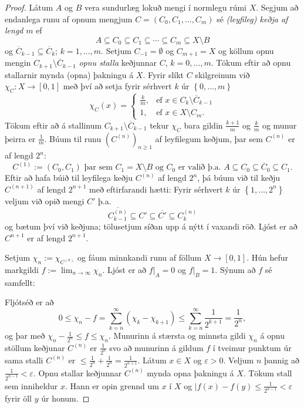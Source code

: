 \documentclass[a4paper,icelandic]{book}
\theoremstyle{definition}
\theoremstyle{plain}
\theoremstyle{remark}
\begin{document}
\begin{proof}
  Látum $A$ og $B$ vera sundurlæg lokuð mengi í normlegu rúmi $X$.
  Segjum að endanlega runu af opnum mengjum $C=(C_0,C_1,\dots,C_m)$ sé
  \emph{(leyfileg) keðja af lengd} $m$ ef\[
  A\subseteq C_0 \subseteq C_1 \subseteq\cdots\subseteq C_m\subseteq
  X\setminus B
  \]
  og $\overline C_{k-1}\subseteq \overline C_k$; $k=1,\dots,m$. Setjum
  $C_{-1}=\emptyset$ og $C_{m+1} = X$ og köllum opnu mengin
  $C_{k+1}\setminus \overline C_{k-1}$ \emph{opnu stalla} keðjunnar $C$,
  $k=0,\dots,m$. Tökum eftir að opnu stallarnir mynda (opna) þakningu á
  $X$. Fyrir slíkt $C$ skilgreinum við $\chi_C:X\to \left[ 0,1 \right]$
  með því að setja fyrir sérhvert $k$ úr $\left\{ 0,\dots,m \right\}$\[
  \chi_C(x) = \begin{cases}
    \frac km, &\text{ef $x\in C_k\setminus \overline C_{k-1}$}\\
    1,        &\text{ef $x\in X\setminus C_m$}.
  \end{cases}
  \]
  Tökum eftir að á stallinum $C_{k+1}\setminus \overline C_{k-1}$ tekur
  $\chi_C$ bara gildin $\frac{k+1}{m}$ og $\frac{k}{m}$ og munur þeirra
  er $\frac 1m$. Búum til runu $(C^{(n)})_{n\geq 1}$ af leyfilegum
  keðjum, þar sem $C^{(n)}$ er af lengd $2^n$:\[
  C^{(1)} := (C_0,C_1)
  \text{ þar sem }
  C_1 = X\setminus B
  \text{ og $C_0$ er valið þ.a. }
  A\subseteq C_0\subseteq\overline C_0 \subseteq C_1.
  \]
  Eftir að hafa búið til leyfilega keðju $C^{(n)}$ af lengd $2^n$, þá
  búum við til keðju $C^{(n+1)}$ af lengd $2^{n+1}$ með eftirfarandi
  hætti: Fyrir sérhvert $k$ úr $\left\{ 1,\dots,2^{n} \right\}$ veljum
  við opið mengi $C'$ þ.a.\[
  \overline{C^{(n)}_{k-1}}
  \subseteq C'
  \subseteq \overline{C'}
  \subseteq C^{(n)}_k
  \]
  og bætum því við keðjuna; tölusetjum síðan upp á nýtt í vaxandi röð.
  Ljóst er að $C^{n+1}$ er af lengd $2^{n+1}$.

  Setjum $\chi_n := \chi_{C^{(n)}}$  og fáum minnkandi runu af föllum
  $X\to\left[ 0,1 \right]$. Hún hefur markgildi $f:=\lim_{n\to\infty}
  \chi_n$. Ljóst er að $f|_A = 0$ og $f|_B = 1$. Sýnum að $f$ sé
  samfellt:

  Fljótséð er að\[
  0
  \leq \chi_n -f 
  = \sum_{k=n}^{\infty}(\chi_k-\chi_{k+1})
  \leq \sum_{k=n}^{\infty} \frac{1}{2^{k+1}}
  = \frac{1}{2^n},
  \]
  og þar með $\chi_n - \frac{1}{2^n}\leq f \leq \chi_n$. Munurinn á
  stærsta og minnsta gildi $\chi_n$ á opnu stöllum keðjunar
  $C^{(n)}$ er $\frac{1}{2^n}$ svo að munurinn á gildum $f$ í tveimur
  punktum úr sama stalli $C^{(n)}$ er $\leq
  \frac{1}{2^n}+\frac{1}{2^n}= \frac{1}{2^{n+1}}$. Látum $x\in X$ og
  $\varepsilon>0$. Veljum $n$ þannig að $\frac{1}{2^{n-1}}<\varepsilon$.
  Opnu stallar keðjunnar $C^{(n)}$ mynda opna þakningu á $X$. Tökum
  stall sem inniheldur $x$. Hann er opin grennd um $x$ í $X$ og
  $|f(x) - f(y)\leq \frac{1}{2^{n-1}}<\varepsilon$ fyrir öll $y$ úr
  honum.
\end{proof}
\end{document}
